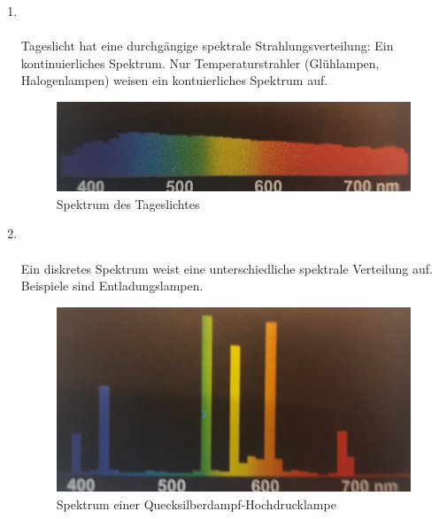 \begin{enumerate}
    \item   {} \\\\
            Tageslicht hat eine durchgängige spektrale Strahlungsverteilung: Ein kontinuierliches Spektrum. Nur Temperaturstrahler (Glühlampen, Halogenlampen) weisen ein kontuierliches Spektrum auf.
            \begin{figure}[!hpt]
                \centering
                \includegraphics{img/Spektrum_des_Tageslichts.png}
                \caption{Spektrum des Tageslichtes}
            \end{figure}

    \item   {}\\\\
            Ein diskretes Spektrum weist eine unterschiedliche spektrale Verteilung auf. Beispiele sind Entladungslampen.
            \begin{figure}[!hpt]
                \centering
                \includegraphics{img/Spektrum_einer_Quecksilberdampg-Hochdrucklampe.png}
                \caption{Spektrum einer Quecksilberdampf-Hochdrucklampe}
            \end{figure} 


\end{enumerate}
